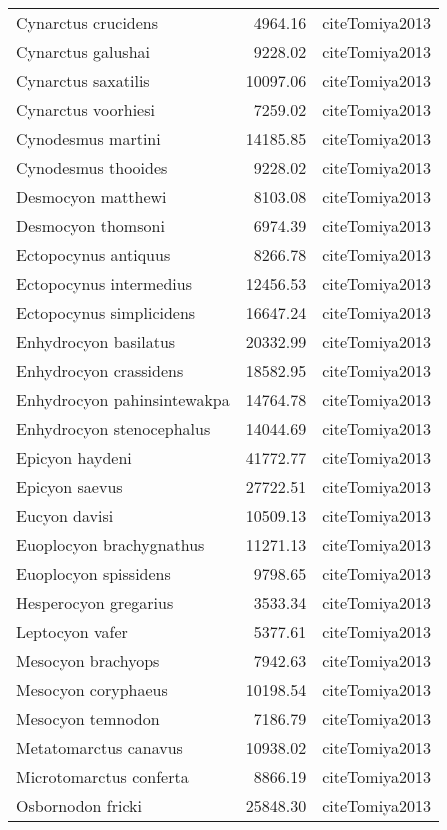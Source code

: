 \begin{table}[ht]
\begin{tabular}{lrl}
  Cynarctus crucidens & 4964.16 & cite{Tomiya2013} \\ 
  Cynarctus galushai & 9228.02 & cite{Tomiya2013} \\ 
  Cynarctus saxatilis & 10097.06 & cite{Tomiya2013} \\ 
  Cynarctus voorhiesi & 7259.02 & cite{Tomiya2013} \\ 
  Cynodesmus martini & 14185.85 & cite{Tomiya2013} \\ 
  Cynodesmus thooides & 9228.02 & cite{Tomiya2013} \\ 
  Desmocyon matthewi & 8103.08 & cite{Tomiya2013} \\ 
  Desmocyon thomsoni & 6974.39 & cite{Tomiya2013} \\ 
  Ectopocynus antiquus & 8266.78 & cite{Tomiya2013} \\ 
  Ectopocynus intermedius & 12456.53 & cite{Tomiya2013} \\ 
  Ectopocynus simplicidens & 16647.24 & cite{Tomiya2013} \\ 
  Enhydrocyon basilatus & 20332.99 & cite{Tomiya2013} \\ 
  Enhydrocyon crassidens & 18582.95 & cite{Tomiya2013} \\ 
  Enhydrocyon pahinsintewakpa & 14764.78 & cite{Tomiya2013} \\ 
  Enhydrocyon stenocephalus & 14044.69 & cite{Tomiya2013} \\ 
  Epicyon haydeni & 41772.77 & cite{Tomiya2013} \\ 
  Epicyon saevus & 27722.51 & cite{Tomiya2013} \\ 
  Eucyon davisi & 10509.13 & cite{Tomiya2013} \\ 
  Euoplocyon brachygnathus & 11271.13 & cite{Tomiya2013} \\ 
  Euoplocyon spissidens & 9798.65 & cite{Tomiya2013} \\ 
  Hesperocyon gregarius & 3533.34 & cite{Tomiya2013} \\ 
  Leptocyon vafer & 5377.61 & cite{Tomiya2013} \\ 
  Mesocyon brachyops & 7942.63 & cite{Tomiya2013} \\ 
  Mesocyon coryphaeus & 10198.54 & cite{Tomiya2013} \\ 
  Mesocyon temnodon & 7186.79 & cite{Tomiya2013} \\ 
  Metatomarctus canavus & 10938.02 & cite{Tomiya2013} \\ 
  Microtomarctus conferta & 8866.19 & cite{Tomiya2013} \\ 
  Osbornodon fricki & 25848.30 & cite{Tomiya2013} \\ 

\end{tabular}
\end{table}

